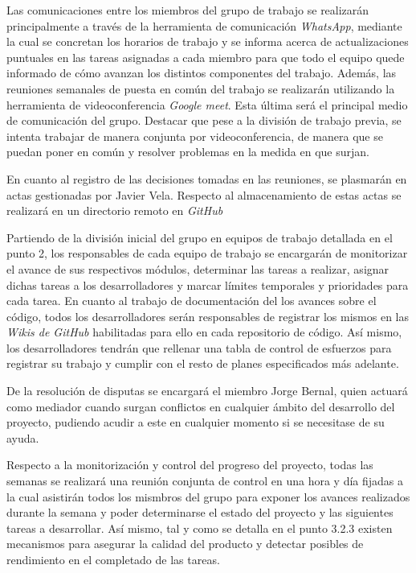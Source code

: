 \documentclass{article}
\begin{document}
Las comunicaciones entre los miembros del grupo de trabajo se realizarán principalmente a través de la herramienta 
de comunicación \textit{WhatsApp}, mediante la cual se concretan los horarios de trabajo 
y se informa acerca de actualizaciones puntuales en las tareas asignadas a cada miembro para que todo el equipo quede 
informado de cómo avanzan los distintos componentes del trabajo. 
Además, las reuniones semanales de puesta en común del trabajo se realizarán utilizando la herramienta de videoconferencia 
\textit{Google meet}. Esta última será el principal medio de comunicación del grupo. 
Destacar que pese a la división de trabajo previa, se intenta trabajar de manera conjunta por videoconferencia, 
de manera que se puedan poner en común y resolver problemas en la medida en que surjan.

En cuanto al registro de las decisiones tomadas en las reuniones, se plasmarán en actas gestionadas 
por Javier Vela. Respecto al almacenamiento de estas actas se realizará en un directorio remoto en \textit{GitHub}

Partiendo de la división inicial del grupo en equipos de trabajo detallada en el punto 2, los responsables
de cada equipo de trabajo se encargarán de monitorizar el avance de sus respectivos módulos, determinar 
las tareas a realizar, asignar dichas tareas a los desarrolladores y marcar límites temporales y prioridades para cada tarea.
En cuanto al trabajo de documentación del los avances sobre el código, todos los desarrolladores serán responsables 
de registrar los mismos en las \textit{Wikis de GitHub} habilitadas para ello en cada repositorio de código.
Así mismo, los desarrolladores tendrán que rellenar una tabla de control de esfuerzos para registrar su trabajo y 
cumplir con el resto de planes especificados más adelante.

De la resolución de disputas se encargará el miembro Jorge Bernal, quien actuará como mediador cuando surgan conflictos en cualquier
ámbito del desarrollo del proyecto, pudiendo acudir a este en cualquier momento si se necesitase de su ayuda.

Respecto a la monitorización y control del progreso del proyecto, todas las semanas se realizará una reunión conjunta
de control en una hora y día fijadas a la cual asistirán todos los mismbros del grupo para exponer los avances realizados
durante la semana y poder determinarse el estado del proyecto y las siguientes tareas a desarrollar. Así mismo, tal y como
se detalla en el punto 3.2.3 existen mecanismos para asegurar la calidad del producto y detectar posibles de rendimiento en 
el completado de las tareas.
\end{document}
